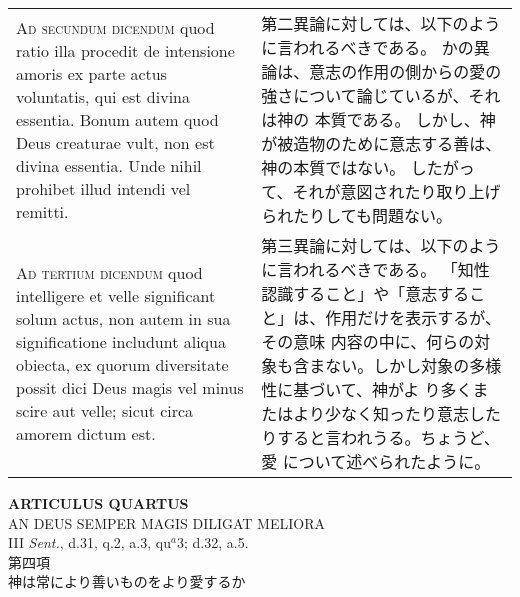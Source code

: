 \documentclass[10pt]{jsarticle} %
\begin{document}
\begin{longtable}{p{21em}p{21em}}
\\


{\scshape Ad secundum dicendum} quod ratio illa procedit
de intensione amoris ex parte actus voluntatis, qui est divina
essentia. Bonum autem quod Deus creaturae vult, non est divina
essentia. Unde nihil prohibet illud intendi vel remitti.


&

第二異論に対しては、以下のように言われるべきである。
かの異論は、意志の作用の側からの愛の強さについて論じているが、それは神の
 本質である。
しかし、神が被造物のために意志する善は、神の本質ではない。
したがって、それが意図されたり取り上げられたりしても問題ない。


\\


{\scshape Ad tertium dicendum} quod intelligere et velle
significant solum actus, non autem in sua significatione includunt
aliqua obiecta, ex quorum diversitate possit dici Deus magis vel minus
scire aut velle; sicut circa amorem dictum est.


&

第三異論に対しては、以下のように言われるべきである。
「知性認識すること」や「意志すること」は、作用だけを表示するが、その意味
 内容の中に、何らの対象も含まない。しかし対象の多様性に基づいて、神がよ
 り多くまたはより少なく知ったり意志したりすると言われうる。ちょうど、愛
 について述べられたように。


\end{longtable}
\newpage



\begin{center}
 {\Large {\bf ARTICULUS QUARTUS}}\\
 {\large AN DEUS SEMPER MAGIS DILIGAT MELIORA}\\
 {\footnotesize III {\itshape Sent.}, d.31, q.2, a.3, qu$^a$3; d.32, a.5.}\\
 {\Large 第四項\\神は常により善いものをより愛するか}
\end{center}
\end{document}
